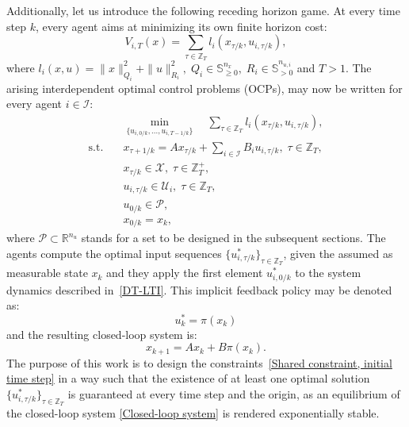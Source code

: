 \documentclass[letterpaper, 10 pt, conference]{ieeeconf}  %
\newcommand{\R}{\mathbb{R}}
\newcommand{\Z}{\mathbb{Z}}
\newcommand{\bbS}{\mathbb{S}}
\newcommand{\mc}[1]{\mathcal{#1}}
\begin{document}
Additionally, let us introduce the following receding horizon game. At every time step $k$, every agent aims at minimizing its own finite horizon cost:
\begin{equation}\label{Finite Horizon Cost}
V_{i,T}(x) = \sum_{\tau \in \Z_{T}}l_{i}(x_{\tau/k}, u_{i,\tau/k}),
\end{equation}
where $l_{i}(x, u) = \|x\|^{2}_{{Q}_{i}} + \|u\|^{2}_{R_{i}},\; Q_{i} \in \bbS^{n_x}_{\geq 0},\; R_{i} \in \bbS^{n_{u,i}}_{> 0}$ and $T > 1$. The arising interdependent optimal control problems (OCPs), may now be written for every agent $i \in \mc{I}$:
\begin{subequations}\label{Interdependent Optimal Control Problems, preliminary version}
\begin{align}
& \min_{\{u_{i,0/k},...,u_{i,T-1/k}\}} \quad \sum_{\tau \in \Z_{T}}l_{i}(x_{\tau/k}, u_{i,\tau/k}),\\
\text{s.t.} \quad & x_{\tau+1/k} = A x_{\tau/k} + \sum_{i \in \mc{I}}B_{i}u_{i,\tau/k},\; \tau \in \Z_{T},\\
& x_{\tau/k} \in \mc{X},\; \tau \in \Z^{+}_{T},\\
& u_{i,\tau/k} \in \mc{U}_{i},\; \tau \in \Z_{T},\\
& u_{0/k} \in \mc{P}, \label{Shared constraint, initial time step}\\
& x_{0/k} = x_{k},
\end{align}
\end{subequations}
where $\mc{P} \subset \R^{n_u}$ stands for a set to be designed in the subsequent sections. The agents compute the optimal input sequences $\{u^{*}_{i,\tau/k}\}_{\tau \in \Z_{T}}$, given the assumed as measurable state $x_{k}$ and they apply the first element $u^{*}_{i,0/k}$ to the system dynamics described in~\eqref{DT-LTI}. This implicit feedback policy may be denoted as:
\begin{equation}\label{Implicit Feedback Policy}
u^{*}_{k} = \pi(x_{k})
\end{equation}
and the resulting closed-loop system is:
\begin{equation}\label{Closed-loop system}
x_{k+1} = A x_{k} + B\pi(x_{k}).
\end{equation}
The purpose of this work is to design the constraints~\eqref{Shared constraint, initial time step} in a way such that the existence of at least one optimal solution $\{u^{*}_{i,\tau/k}\}_{\tau \in \Z_{T}}$ is guaranteed at every time step and the origin, as an equilibrium of the closed-loop system \eqref{Closed-loop system} is rendered exponentially stable.
\end{document}
